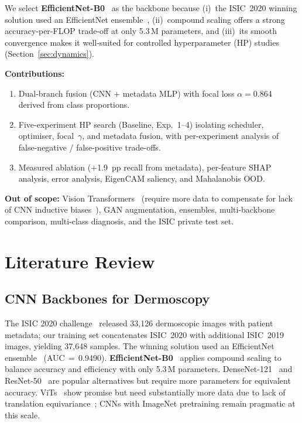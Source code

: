 \documentclass[conference]{IEEEtran}
\begin{document}
We select \textbf{EfficientNet-B0}~\cite{b8} as the backbone because
(i)~the ISIC~2020 winning solution used an EfficientNet ensemble~\cite{b7},
(ii)~compound scaling offers a strong accuracy-per-FLOP trade-off at only
5.3\,M parameters, and (iii)~its smooth convergence makes it well-suited for
controlled hyperparameter (HP) studies (Section~\ref{sec:dynamics}).

\smallskip\noindent\textbf{Contributions:}
\begin{enumerate}
\item Dual-branch fusion (CNN + metadata MLP) with focal loss
      $\alpha{=}0.864$ derived from class proportions.
\item Five-experiment HP search (Baseline, Exp.~1--4) isolating
      scheduler, optimiser, focal~$\gamma$, and metadata fusion, with
      per-experiment analysis of false-negative / false-positive
      trade-offs.
\item Measured ablation ($+$1.9~pp recall from metadata), per-feature SHAP
      analysis, error analysis, EigenCAM saliency, and Mahalanobis OOD.
\end{enumerate}

\noindent\textbf{Out of scope:} Vision Transformers~\cite{b17,b18} (require
more data to compensate for lack of CNN inductive biases~\cite{b17}), GAN
augmentation, ensembles, multi-backbone comparison, multi-class diagnosis,
and the ISIC private test set.

\section{Literature Review}

\subsection{CNN Backbones for Dermoscopy}
The ISIC 2020 challenge~\cite{b6} released 33{,}126 dermoscopic images with
patient metadata; our training set concatenates ISIC~2020 with additional
ISIC~2019 images, yielding 37{,}648 samples. The winning solution used an EfficientNet
ensemble~\cite{b7} (AUC$\,{=}\,$0.9490). \textbf{EfficientNet-B0}~\cite{b8}
applies compound scaling to balance accuracy and efficiency with only 5.3\,M
parameters. DenseNet-121~\cite{b9} and ResNet-50~\cite{b10} are popular
alternatives but require more parameters for equivalent accuracy.
ViTs~\cite{b17,b18} show promise but need substantially more data due to
lack of translation equivariance~\cite{b17}; CNNs with ImageNet pretraining
remain pragmatic at this scale.
\end{document}
